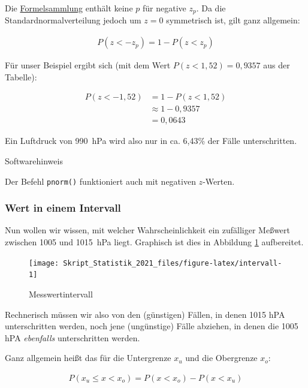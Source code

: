 \documentclass[
  11pt,
  ngerman,
  a4paper,
]{report}
\begin{document}
Die \href{Formelsammlung\%20und\%20Wertetabellen.pdf}{Formelsammlung} enthält keine \(p\) für negative \(z_p\). Da die Standardnormalverteilung jedoch um \(z=0\) symmetrisch ist, gilt ganz allgemein:

\[
  \begin{aligned}
    P(z < -z_p) = 1 - P(z < z_p)
  \end{aligned}
  \label{eq:neg}
\]

Für unser Beispiel ergibt sich (mit dem Wert \(P(z < 1,52) = 0{,}9357\) aus der Tabelle):

\[
  \begin{aligned}
    P(z < -1,52) &= 1 - P(z < 1,52) \\
    &\approx 1-0{,}9357 \\
    &=0{,}0643
  \end{aligned}
\]

Ein Luftdruck von 990~hPa wird also nur in ca. 6,43\% der Fälle unterschritten.

Softwarehinweis

Der Befehl \texttt{pnorm()} funktioniert auch mit negativen \(z\)-Werten.

\hypertarget{wert-in-einem-intervall}{%
\subsubsection{Wert in einem Intervall}\label{wert-in-einem-intervall}}

Nun wollen wir wissen, mit welcher Wahrscheinlichkeit ein zufälliger Meßwert zwischen 1005 und 1015~hPa liegt. Graphisch ist dies in Abbildung \ref{fig:intervall} aufbereitet.

\begin{figure}[!h]

{\centering \texttt{[image: Skript\_Statistik\_2021\_files/figure-latex/intervall-1]} 

}

\caption{Messwertintervall}\label{fig:intervall}
\end{figure}

Rechnerisch müssen wir also von den (günstigen) Fällen, in denen 1015 hPA unterschritten werden, noch jene (ungünstige) Fälle abziehen, in denen die 1005 hPA \emph{ebenfalls} unterschritten werden.

Ganz allgemein heißt das für die Untergrenze \(x_u\) und die Obergrenze \(x_o\):

\[\begin{aligned}
    P(x_{u} \leq x < x_{o}) = P(x < x_{o}) - P(x < x_{u})
  \end{aligned}
  \label{eq:intervall}
\]
\end{document}
